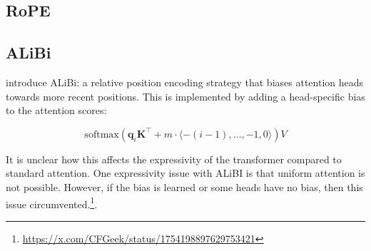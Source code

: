 
\subsection{RoPE}


\subsection{ALiBi}

\citet{press2022train} introduce ALiBi: a relative position encoding strategy that biases attention heads towards more recent positions.
This is implemented by adding a head-specific bias to the attention scores:

\begin{equation*}
    \mathrm{softmax}\left( \mathbf q_i \mathbf K^\top + m \cdot \langle -(i-1), \ldots, -1, 0 \rangle \right)V
\end{equation*}

It is unclear how this affects the expressivity of the transformer compared to standard attention.
One expressivity issue with ALiBI is that uniform attention is not possible.
However, if the bias is learned or some heads have no bias, then this issue circumvented.\footnote{\url{https://x.com/CFGeek/status/1754198897629753421}}.